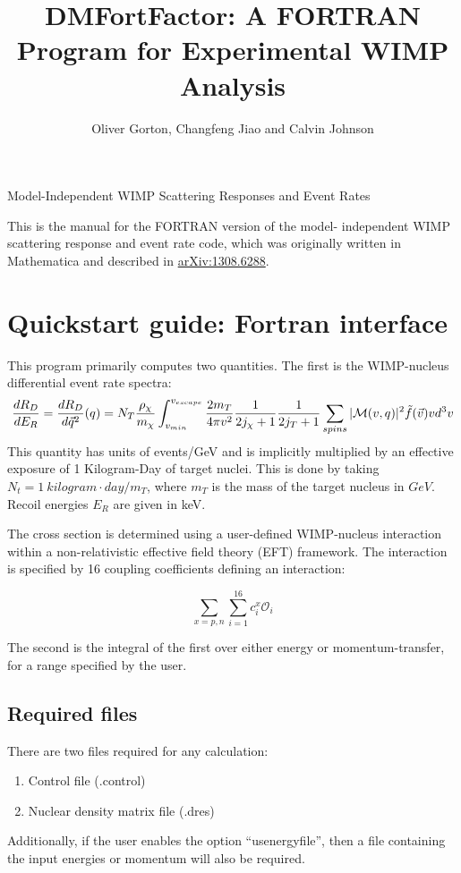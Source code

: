\documentclass[11pt]{article}
\title{DMFortFactor: A FORTRAN Program for Experimental WIMP Analysis}
\author{Oliver Gorton, Changfeng Jiao and Calvin Johnson}
\begin{document}
\maketitle

{

\centering

Model-Independent WIMP Scattering Responses and Event Rates

}

\tableofcontents

This is the manual for the FORTRAN version of the model- independent WIMP 
scattering response and event rate code, which was originally written in 
Mathematica and described in 
\href{http://arxiv.org/abs/1308.6288v1}{arXiv:1308.6288}.

\clearpage

\section{Quickstart guide: Fortran interface}
This program primarily computes two quantities. The first is the WIMP-nucleus
differential event rate spectra:
\begin{dmath}
\frac{dR_D}{dE_R} = \frac{dR_D}{d\vec{q}^2}(q)
	\\= N_T\frac{\rho_\chi}{m_\chi}\int_{v_{min}}^{v_{escape}} 
	\frac{2m_T}{4\pi v^2}\frac{1}{2j_\chi+1}\frac{1}{2j_T+1}
	\sum_{spins}|\mathcal{M}(v,q)|^2  \tilde{f}(\vec{v})vd^3v
\end{dmath}
This quantity has units of events/GeV and is implicitly multiplied by
an effective exposure of 1 Kilogram-Day of target nuclei. This is done by
taking $N_t = 1\ kilogram\cdot day / m_T$, where $m_T$ is the mass of the target
nucleus in $GeV$. Recoil energies $E_R$ are given in keV.

The cross section is determined using a user-defined WIMP-nucleus interaction
within a non-relativistic effective field theory (EFT) framework. The
interaction is specified by 16 coupling coefficients defining an interaction:

\begin{equation}
	\sum_{x=p,n}\sum_{i=1}^{16} c_i^x \mathcal{O}_i
\end{equation}

The second is the integral of the first over either energy or momentum-transfer,
for a range specified by the user. 

\subsection{Required files}
There are two files required for any calculation:
\begin{enumerate}
    \item Control file (.control)
    \item Nuclear density matrix file (.dres)
\end{enumerate}
Additionally, if the user enables the option ``usenergyfile'', then a file
containing the input energies or momentum will also be required.
\end{document}
